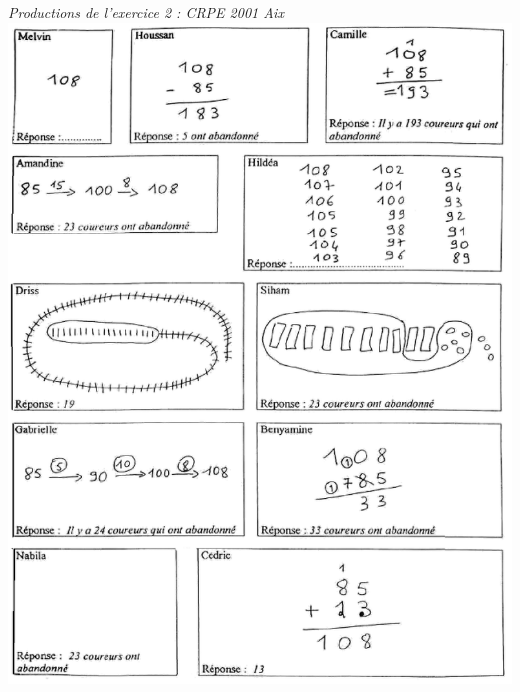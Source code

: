 \pagebreak


\begin{center}
   {\it Productions de l'exercice 2 : CRPE 2001 Aix} \\ [3mm]
   \includegraphics[width=16.5cm]{Nombres_et_calculs_did/Images/Num2_analyse_coureurs}
\end{center}

